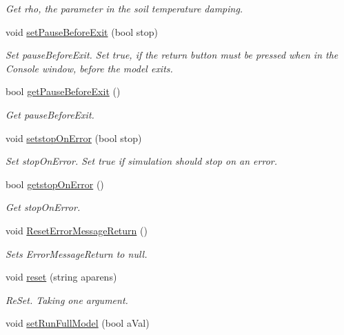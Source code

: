 \begin{DoxyCompactItemize}
\begin{DoxyCompactList}\small\item\em Get rho, the parameter in the soil temperature damping. \end{DoxyCompactList}\item 
void \mbox{\hyperlink{class_global_vars_ac26e11e3695f100eeb3081cd4c0fa3d4}{set\+Pause\+Before\+Exit}} (bool stop)
\begin{DoxyCompactList}\small\item\em Set pause\+Before\+Exit. Set true, if the return button must be pressed when in the Console window, before the model exits. \end{DoxyCompactList}\item 
bool \mbox{\hyperlink{class_global_vars_a120f63405f7efd3dd9f062d9abee01e6}{get\+Pause\+Before\+Exit}} ()
\begin{DoxyCompactList}\small\item\em Get pause\+Before\+Exit. \end{DoxyCompactList}\item 
void \mbox{\hyperlink{class_global_vars_ac8f9c5d7b120a129ca545b072ed7d178}{setstop\+On\+Error}} (bool stop)
\begin{DoxyCompactList}\small\item\em Set stop\+On\+Error. Set true if simulation should stop on an error. \end{DoxyCompactList}\item 
bool \mbox{\hyperlink{class_global_vars_af818a48cc2a3646bfdf81ce83d256c75}{getstop\+On\+Error}} ()
\begin{DoxyCompactList}\small\item\em Get stop\+On\+Error. \end{DoxyCompactList}\item 
void \mbox{\hyperlink{class_global_vars_a5388dae8764cf038368193b867e881b2}{Reset\+Error\+Message\+Return}} ()
\begin{DoxyCompactList}\small\item\em Sets Error\+Message\+Return to null. \end{DoxyCompactList}\item 
void \mbox{\hyperlink{class_global_vars_a76cfa6a2f43f92c148c8abf8664122f0}{reset}} (string aparens)
\begin{DoxyCompactList}\small\item\em Re\+Set. Taking one argument. \end{DoxyCompactList}\item 
void \mbox{\hyperlink{class_global_vars_ab3a4996343d225c668511fb607588ee6}{set\+Run\+Full\+Model}} (bool a\+Val)

\end{DoxyCompactItemize}
